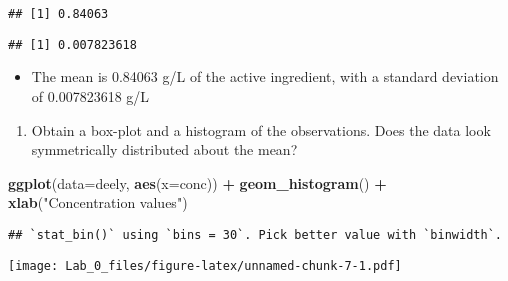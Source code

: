 \documentclass[]{article}
\newenvironment{Shaded}{\begin{snugshade}}{\end{snugshade}}
\newcommand{\KeywordTok}[1]{\textcolor[rgb]{0.13,0.29,0.53}{\textbf{#1}}}
\newcommand{\DataTypeTok}[1]{\textcolor[rgb]{0.13,0.29,0.53}{#1}}
\newcommand{\StringTok}[1]{\textcolor[rgb]{0.31,0.60,0.02}{#1}}
\newcommand{\OperatorTok}[1]{\textcolor[rgb]{0.81,0.36,0.00}{\textbf{#1}}}
\newcommand{\NormalTok}[1]{#1}
\providecommand{\tightlist}{%
  \setlength{\itemsep}{0pt}\setlength{\parskip}{0pt}}
\begin{document}
\begin{Shaded}
\end{Shaded}

\begin{verbatim}
## [1] 0.84063
\end{verbatim}

\begin{Shaded}
\end{Shaded}

\begin{verbatim}
## [1] 0.007823618
\end{verbatim}

\begin{itemize}
\tightlist
\item
  The mean is 0.84063 g/L of the active ingredient, with a standard
  deviation of 0.007823618 g/L
\end{itemize}

\begin{enumerate}
\def\labelenumi{\alph{enumi})}
\setcounter{enumi}{1}
\tightlist
\item
  Obtain a box-plot and a histogram of the observations. Does the data
  look symmetrically distributed about the mean?
\end{enumerate}

\begin{Shaded}
\begin{Highlighting}[]
\KeywordTok{ggplot}\NormalTok{(}\DataTypeTok{data=}\NormalTok{deely, }\KeywordTok{aes}\NormalTok{(}\DataTypeTok{x=}\NormalTok{conc)) }\OperatorTok{+}\StringTok{ }\KeywordTok{geom_histogram}\NormalTok{() }\OperatorTok{+}\StringTok{ }\KeywordTok{xlab}\NormalTok{(}\StringTok{"Concentration values"}\NormalTok{)}
\end{Highlighting}
\end{Shaded}

\begin{verbatim}
## `stat_bin()` using `bins = 30`. Pick better value with `binwidth`.
\end{verbatim}

\texttt{[image: Lab\_0\_files/figure-latex/unnamed-chunk-7-1.pdf]}
\end{document}
